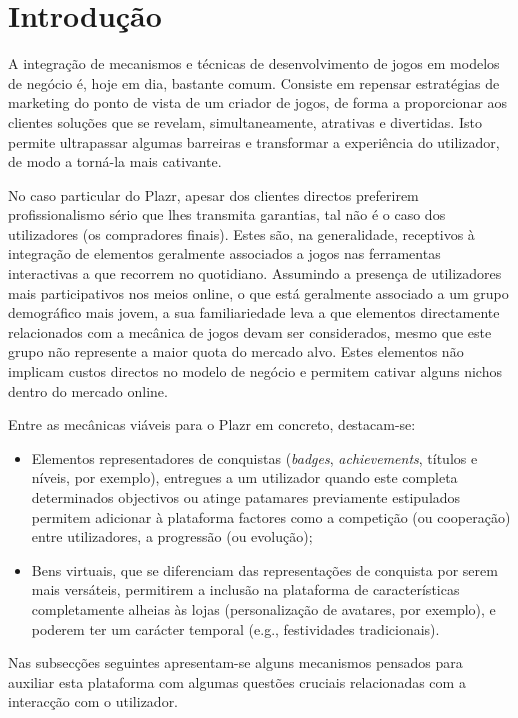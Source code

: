 \section{Introdução}
A integração de mecanismos e técnicas de desenvolvimento de jogos em modelos de negócio é, hoje em dia, bastante comum.
Consiste em repensar estratégias de marketing do ponto de vista de um criador de jogos, de forma a proporcionar aos clientes soluções que se revelam, simultaneamente, atrativas e divertidas.
Isto permite ultrapassar algumas barreiras %
e transformar a experiência do utilizador, de modo a torná-la mais cativante.

No caso particular do Plazr, apesar dos clientes directos preferirem profissionalismo sério que lhes transmita garantias, tal não é o caso dos utilizadores (os compradores finais).
Estes são, na generalidade, receptivos à integração de elementos geralmente associados a jogos nas ferramentas interactivas a que recorrem no quotidiano.
Assumindo a presença de utilizadores mais participativos nos meios online, o que está geralmente associado a um grupo demográfico mais jovem, a sua familiariedade leva a que elementos directamente relacionados com a mecânica de jogos devam ser considerados, mesmo que este grupo não represente a maior quota do mercado alvo. Estes elementos não implicam custos directos no modelo de negócio e permitem cativar alguns nichos dentro do mercado online.

Entre as mecânicas viáveis para o Plazr em concreto, destacam-se:
\begin{itemize}
\item Elementos representadores de conquistas (\textit{badges}, \textit{achievements}, títulos e níveis, por exemplo), entregues a um utilizador quando este completa determinados objectivos ou atinge patamares previamente estipulados permitem adicionar à plataforma factores como a competição (ou cooperação) entre utilizadores, a progressão (ou evolução);
\item Bens virtuais, que se diferenciam das representações de conquista por serem mais versáteis, permitirem a inclusão na plataforma de características completamente alheias às lojas (personalização de avatares, por exemplo), e poderem ter um carácter temporal (e.g., festividades tradicionais).
\end{itemize}

Nas subsecções seguintes apresentam-se alguns mecanismos pensados para auxiliar esta plataforma com algumas questões cruciais relacionadas com a interacção com o utilizador.